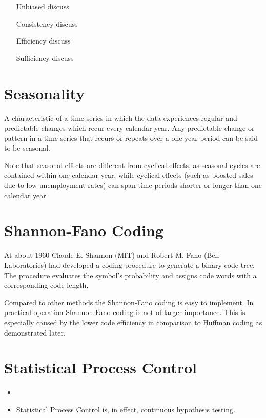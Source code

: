 \begin{itemize}
	\item[Unbiased] discuss
	\item[Consistency] discuss
	\item[Efficiency] discuss
	\item[Sufficiency] discuss
\end{itemize}



\section{Seasonality}
A characteristic of a time series in which the data experiences regular and predictable changes which recur every calendar year. Any predictable change or pattern in a time series that recurs or repeats over a one-year period can be said to be seasonal.

Note that seasonal effects are different from cyclical effects, as seasonal cycles are contained within one calendar year, while cyclical effects (such as boosted sales due to low unemployment rates) can span time periods shorter or longer than one calendar year


\section{Shannon-Fano Coding}

At about 1960 Claude E. Shannon (MIT) and Robert M. Fano (Bell Laboratories) had developed a coding procedure to generate a binary code tree. The procedure evaluates the symbol's probability and assigns code words with a corresponding code length.

Compared to other methods the Shannon-Fano coding is easy to implement. In practical operation Shannon-Fano coding is not of larger importance. This is especially caused by the lower code efficiency in comparison to Huffman coding as demonstrated later.




\section{Statistical Process Control}


\begin{itemize}
	\item
	\item Statistical Process Control is, in effect, continuous hypothesis testing.
\end{itemize}
%
%


